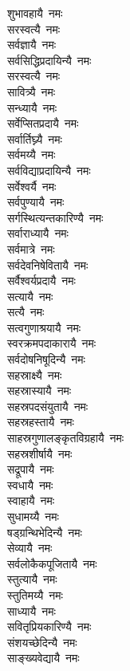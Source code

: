 \begin{flushleft}
\begin{multicols}{2}
शुभावहायै~नमः\\
सरस्वत्यै~नमः\\
सर्वज्ञायै~नमः\\
सर्वसिद्धिप्रदायिन्यै~नमः\\
सरस्वत्यै~नमः\\
सावित्र्यै~नमः\\
सन्ध्यायै~नमः\\
सर्वेप्सितप्रदायै~नमः\hfill{}\\
सर्वार्तिघ्न्यै~नमः\\
सर्वमय्यै~नमः\\
सर्वविद्याप्रदायिन्यै~नमः\\
सर्वेश्वर्यै~नमः\\
सर्वपुण्यायै~नमः\\
सर्गस्थित्यन्तकारिण्यै~नमः\\
सर्वाराध्यायै~नमः\\
सर्वमात्रे~नमः\\
सर्वदेवनिषेवितायै~नमः\\
सर्वैश्वर्यप्रदायै~नमः\hfill{}\\
सत्यायै~नमः\\
सत्यै~नमः\\
सत्वगुणाश्रयायै~नमः\\
स्वरक्रमपदाकारायै~नमः\\
सर्वदोषनिषूदिन्यै~नमः\\
सहस्राक्ष्यै~नमः\\
सहस्रास्यायै~नमः\\
सहस्रपदसंयुतायै~नमः\\
सहस्रहस्तायै~नमः\\
साहस्रगुणालङ्कृतविग्रहायै~नमः\hfill{}\\
सहस्रशीर्षायै~नमः\\
सद्रूपायै~नमः\\
स्वधायै~नमः\\
स्वाहायै~नमः\\
सुधामय्यै~नमः\\
षड्ग्रन्थिभेदिन्यै~नमः\\
सेव्यायै~नमः\\
सर्वलोकैकपूजितायै~नमः\\
स्तुत्यायै~नमः\\
स्तुतिमय्यै~नमः\hfill{}\\
साध्यायै~नमः\\
सवितृप्रियकारिण्यै~नमः\\
संशयच्छेदिन्यै~नमः\\
साङ्ख्यवेद्यायै~नमः\\

\end{multicols}
\end{flushleft}
